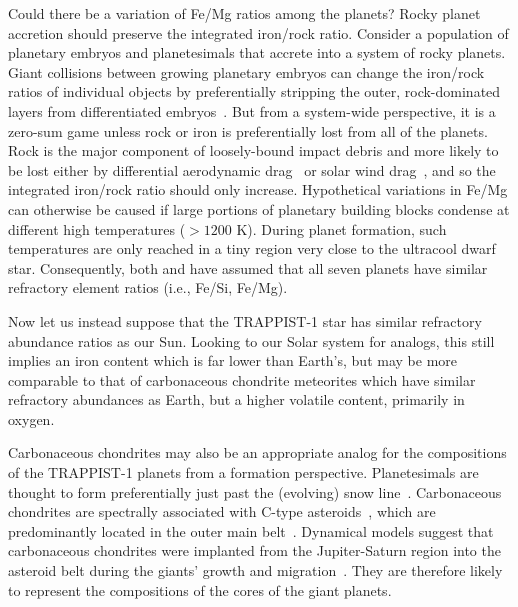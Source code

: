 \documentclass[fleqn,usenatbib]{mnras} %
\begin{document}
Could there be a variation of Fe/Mg ratios among the planets?
Rocky planet accretion should preserve the integrated iron/rock ratio. Consider a population of planetary embryos and planetesimals that accrete into a system of rocky planets. Giant collisions between growing planetary embryos can change the iron/rock ratios of individual objects by preferentially stripping the outer, rock-dominated layers from differentiated embryos~\citep[e.g.][]{benz88,marcus10,asphaug14}. But from a system-wide perspective, it is a zero-sum game unless rock or iron is preferentially lost from all of the planets. Rock is the major component of loosely-bound impact debris and more likely to be lost either by differential aerodynamic drag~\citep{weidenschilling77} or solar wind drag~\citep{spalding20}, and so the integrated iron/rock ratio should only increase.
Hypothetical variations in Fe/Mg can otherwise be caused if large portions of planetary building blocks condense at different high temperatures (${>} 1200$ K). During planet formation, such temperatures are only reached in a tiny region very close to the ultracool dwarf star. Consequently, both \citet{Unterborn2018a} and \citet{Dorn2018} have assumed that all seven planets have similar refractory element ratios (i.e., Fe/Si, Fe/Mg).

Now let us instead suppose that the TRAPPIST-1 star has similar refractory abundance ratios as our Sun.  Looking to our Solar system for analogs, this still implies an iron content which is far lower than Earth's, but may be more comparable to that of carbonaceous chondrite meteorites which have similar refractory abundances as Earth, but a higher volatile content, primarily in oxygen.

Carbonaceous chondrites may also be an appropriate analog for the compositions of the TRAPPIST-1 planets from a formation perspective. Planetesimals are thought to form preferentially just past the (evolving) snow line~\citep{armitage16,drazkowska17,schoonenberg17}.  Carbonaceous chondrites are spectrally associated with C-type asteroids~\citep{bus02,burbine02}, which are predominantly located in the outer main belt~\citep{gradie82,demeo13}.  Dynamical models suggest that carbonaceous chondrites were implanted from the Jupiter-Saturn region into the asteroid belt during the giants' growth and migration~\citep{walsh11,raymond17,ronnet18,raymond20}.  They are therefore likely to represent the compositions of the cores of the giant planets.
\end{document}
